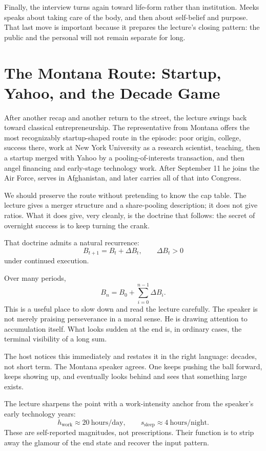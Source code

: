 Finally, the interview turns again toward life-form rather than institution. Meeks speaks about taking care of the body, and then about self-belief and purpose. That last move is important because it prepares the lecture's closing pattern: the public and the personal will not remain separate for long.

\section{The Montana Route: Startup, Yahoo, and the Decade Game}

After another recap and another return to the street, the lecture swings back toward classical entrepreneurship. The representative from Montana offers the most recognizably startup-shaped route in the episode: poor origin, college, success there, work at New York University as a research scientist, teaching, then a startup merged with Yahoo by a pooling-of-interests transaction, and then angel financing and early-stage technology work. After September 11 he joins the Air Force, serves in Afghanistan, and later carries all of that into Congress.

We should preserve the route without pretending to know the cap table. The lecture gives a merger structure and a share-pooling description; it does not give ratios. What it does give, very cleanly, is the doctrine that follows: the secret of overnight success is to keep turning the crank.

That doctrine admits a natural recurrence:
\begin{equation}
B_{t+1}=B_t+\Delta B_t,\qquad \Delta B_t>0
\end{equation}
under continued execution.

Over many periods,
\begin{equation}
B_n=B_0+\sum_{i=0}^{n-1}\Delta B_i.
\end{equation}
This is a useful place to slow down and read the lecture carefully. The speaker is not merely praising perseverance in a moral sense. He is drawing attention to accumulation itself. What looks sudden at the end is, in ordinary cases, the terminal visibility of a long sum.

The host notices this immediately and restates it in the right language: decades, not short term. The Montana speaker agrees. One keeps pushing the ball forward, keeps showing up, and eventually looks behind and sees that something large exists.

The lecture sharpens the point with a work-intensity anchor from the speaker's early technology years:
\begin{equation}
h_{\text{work}}\approx 20\ \text{hours/day},\qquad s_{\text{sleep}}\approx 4\ \text{hours/night}.
\end{equation}
These are self-reported magnitudes, not prescriptions. Their function is to strip away the glamour of the end state and recover the input pattern.

